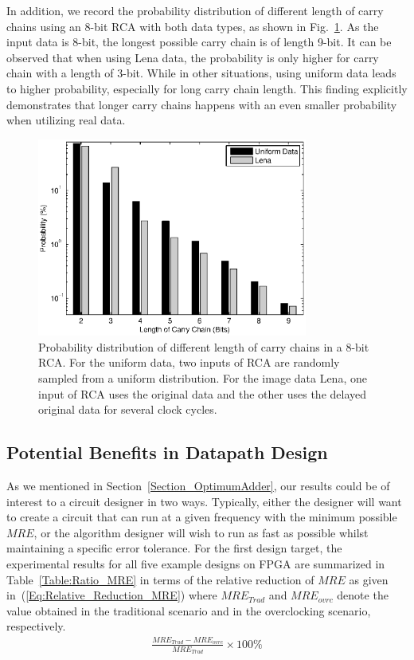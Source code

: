 \documentclass[prodmode,acmtrets]{acmsmall} %
\begin{document}

In addition, we record the probability distribution of different length of carry chains using an 8-bit RCA with both data types, as shown in Fig.~\ref{Fig:CarryDistribution}. As the input data is 8-bit, the longest possible carry chain is of length 9-bit. It can be observed that when using Lena data,  the probability is only higher for carry chain with a length of 3-bit. While in other situations, using uniform data leads to higher probability, especially for long carry chain length. This finding explicitly demonstrates that longer carry chains happens with an even smaller probability when utilizing real data.
%
\begin{figure}[tbp]
  \centering
  \vspace{-2ex}
  \includegraphics[width=3.5in]{./Figures/CC_length3.eps}
  \vspace{-1.5ex}
  \caption{Probability distribution of different length of carry chains in a 8-bit RCA. For the uniform data, two inputs of RCA are randomly sampled from a uniform distribution. For the image data Lena, one input of RCA uses the original data and the other uses the delayed original data for several clock cycles.}
  \label{Fig:CarryDistribution}
  \vspace{-1ex}
\end{figure}

\subsection{Potential Benefits in Datapath Design}
As we mentioned in Section~\ref{Section_OptimumAdder}, our results could be of interest to a circuit designer in two ways. Typically, either the designer will want to create a circuit that can run at a given frequency with the minimum possible $MRE$, or the algorithm designer will wish to run as fast as possible whilst maintaining a specific error tolerance. For the first design target, the experimental results for all five example designs on FPGA are summarized in Table~\ref{Table:Ratio_MRE} in terms of the relative reduction of $MRE$ as given in~(\ref{Eq:Relative_Reduction_MRE}) where $MRE_{Trad}$ and $MRE_{ovrc}$ denote the value obtained in the traditional scenario and in the overclocking scenario, respectively.
%
\begin{eqnarray}\label{Eq:Relative_Reduction_MRE}
  \frac{MRE_{Trad}-MRE_{ovrc}}{MRE_{Trad}}\times 100\%
\end{eqnarray}
\end{document}
